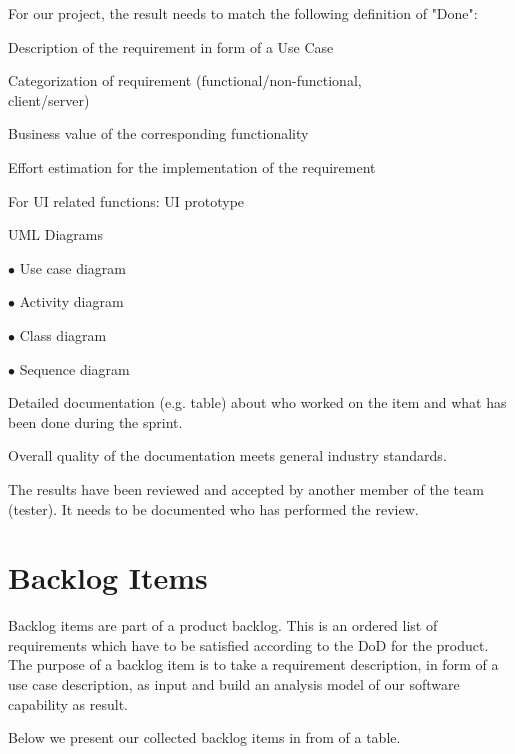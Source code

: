 \documentclass[a4paper, 12pt]{article}
\begin{document}
For our project, the result needs to match the following definition of "Done":
\begin{todolist}

\item Description of the requirement in form of a Use Case
\item Categorization of requirement (functional/non-functional,\\
      client/server)
\item Business value of the corresponding functionality
\item Effort estimation for the implementation of the requirement
\item For UI related functions: UI prototype
\item UML Diagrams 

    $\bullet$ Use case diagram
    
    $\bullet$ Activity diagram
    
    $\bullet$ Class diagram
    
    $\bullet$ Sequence diagram
    
\item Detailed documentation (e.g. table) about who worked on the item and what has been done during the sprint.
\item Overall quality of the documentation meets general industry standards.
\item The results have been reviewed and accepted by another member of the team (tester). It needs to be documented who has performed the review.

\end{todolist}


\section{Backlog Items}
Backlog items are part of a product backlog. This is an ordered list of requirements which have to be satisfied according to the DoD for the product. The purpose of a backlog item is to take a requirement description, in form of a use case description, as input and build an analysis model of our software capability as result.

Below we present our collected backlog items in from of a table.



\end{document}
